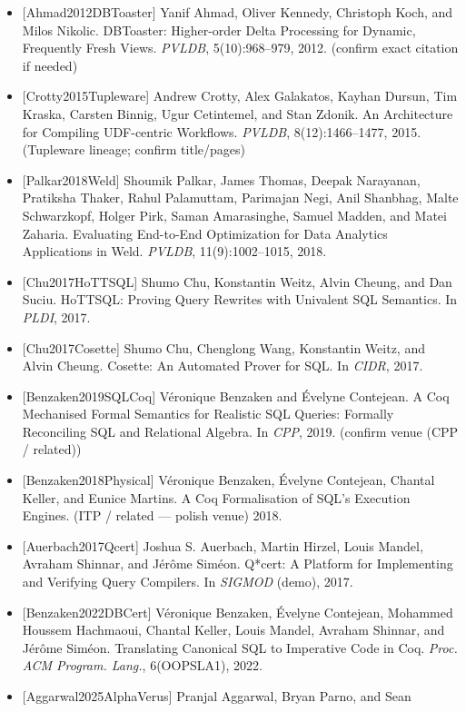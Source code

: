 \documentclass[
  10pt,
]{article}
\begin{document}
\begin{itemize}
\item
  {[}Ahmad2012DBToaster{]} Yanif Ahmad, Oliver Kennedy, Christoph Koch,
  and Milos Nikolic. DBToaster: Higher-order Delta Processing for
  Dynamic, Frequently Fresh Views. \emph{PVLDB}, 5(10):968--979, 2012.
  (confirm exact citation if needed)
\item
  {[}Crotty2015Tupleware{]} Andrew Crotty, Alex Galakatos, Kayhan
  Dursun, Tim Kraska, Carsten Binnig, Ugur Cetintemel, and Stan Zdonik.
  An Architecture for Compiling UDF-centric Workflows. \emph{PVLDB},
  8(12):1466--1477, 2015. (Tupleware lineage; confirm title/pages)
\item
  {[}Palkar2018Weld{]} Shoumik Palkar, James Thomas, Deepak Narayanan,
  Pratiksha Thaker, Rahul Palamuttam, Parimajan Negi, Anil Shanbhag,
  Malte Schwarzkopf, Holger Pirk, Saman Amarasinghe, Samuel Madden, and
  Matei Zaharia. Evaluating End-to-End Optimization for Data Analytics
  Applications in Weld. \emph{PVLDB}, 11(9):1002--1015, 2018.
\item
  {[}Chu2017HoTTSQL{]} Shumo Chu, Konstantin Weitz, Alvin Cheung, and
  Dan Suciu. HoTTSQL: Proving Query Rewrites with Univalent SQL
  Semantics. In \emph{PLDI}, 2017.
\item
  {[}Chu2017Cosette{]} Shumo Chu, Chenglong Wang, Konstantin Weitz, and
  Alvin Cheung. Cosette: An Automated Prover for SQL. In \emph{CIDR},
  2017.
\item
  {[}Benzaken2019SQLCoq{]} Véronique Benzaken and Évelyne Contejean. A
  Coq Mechanised Formal Semantics for Realistic SQL Queries: Formally
  Reconciling SQL and Relational Algebra. In \emph{CPP}, 2019. (confirm
  venue (CPP / related))
\item
  {[}Benzaken2018Physical{]} Véronique Benzaken, Évelyne Contejean,
  Chantal Keller, and Eunice Martins. A Coq Formalisation of SQL's
  Execution Engines. (ITP / related --- polish venue) 2018.
\item
  {[}Auerbach2017Qcert{]} Joshua S. Auerbach, Martin Hirzel, Louis
  Mandel, Avraham Shinnar, and Jérôme Siméon. Q*cert: A Platform for
  Implementing and Verifying Query Compilers. In \emph{SIGMOD} (demo),
  2017.
\item
  {[}Benzaken2022DBCert{]} Véronique Benzaken, Évelyne Contejean,
  Mohammed Houssem Hachmaoui, Chantal Keller, Louis Mandel, Avraham
  Shinnar, and Jérôme Siméon. Translating Canonical SQL to Imperative
  Code in Coq. \emph{Proc. ACM Program. Lang.}, 6(OOPSLA1), 2022.
\item
  {[}Aggarwal2025AlphaVerus{]} Pranjal Aggarwal, Bryan Parno, and Sean

\end{itemize}
\end{document}
